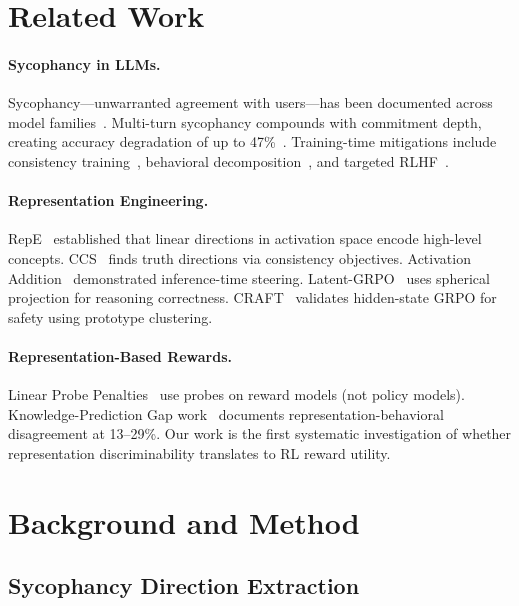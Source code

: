\documentclass[11pt,a4paper]{article}
\begin{document}
\section{Related Work}

\paragraph{Sycophancy in LLMs.} Sycophancy---unwarranted agreement with users---has been documented across model families~\cite{perez2023discovering,sharma2024towards,wei2024measuring}. Multi-turn sycophancy compounds with commitment depth, creating accuracy degradation of up to 47\%~\cite{chen2024truth}. Training-time mitigations include consistency training~\cite{mitchell2024act}, behavioral decomposition~\cite{stengel2024pressure}, and targeted RLHF~\cite{bai2022training}.

\paragraph{Representation Engineering.} RepE~\cite{zou2023representation} established that linear directions in activation space encode high-level concepts. CCS~\cite{burns2023discovering} finds truth directions via consistency objectives. Activation Addition~\cite{turner2023activation} demonstrated inference-time steering. Latent-GRPO~\cite{zhang2026latent} uses spherical projection for reasoning correctness. CRAFT~\cite{wang2025craft} validates hidden-state GRPO for safety using prototype clustering.

\paragraph{Representation-Based Rewards.} Linear Probe Penalties~\cite{burns2024linear} use probes on reward models (not policy models). Knowledge-Prediction Gap work~\cite{kadavath2022language} documents representation-behavioral disagreement at 13--29\%. Our work is the first systematic investigation of whether representation discriminability translates to RL reward utility.

\section{Background and Method}

\subsection{Sycophancy Direction Extraction}
\end{document}
